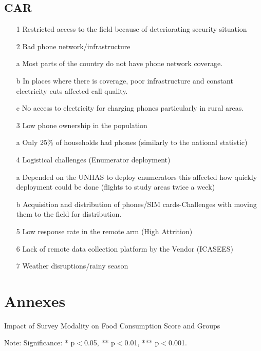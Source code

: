 \documentclass[11pt,harvard]{article}
\begin{document}
\subsection{CAR}

\begin{itemize}[label=--, left=1.5em]
	\item[1] Restricted access to the field because of deteriorating security situation
	\item[2] Bad phone network/infrastructure 
		\item[a]	Most parts of the country do not have phone network coverage.
		\item[b]	In places where there is coverage, poor infrastructure and constant electricity cuts affected call quality.
		\item[c]	No access to electricity for charging phones particularly in rural areas.
	\item[3] Low phone ownership in the population
		\item[a] Only 25\% of households had phones (similarly to the national statistic)
	\item[4] Logistical challenges (Enumerator deployment)
		\item[a]	Depended on the UNHAS to deploy enumerators this affected how quickly deployment could be done (flights to study areas twice a week)
		\item[b]	Acquisition and distribution of phones/SIM cards-Challenges with moving them to the field for distribution.
	\item[5] Low response rate in the remote arm (High Attrition)
	\item[6] Lack of remote data collection platform by the Vendor (ICASEES) 
	\item[7] Weather disruptions/rainy season
\end{itemize}


\pagebreak


\section{Annexes}

	\begin{table}[htbp]
	\centering
	\begin{adjustbox}{max width=\textwidth}
		\begin{threeparttable}
			\caption{Impact of Survey Modality on Food Consumption Score and Groups}
			\scriptsize
			 
			\label{tab:FCS_Modality_All_Country_Short}
			\begin{tablenotes}
				\item Note: Significance: * p$<$0.05, ** p$<$0.01, *** p$<$0.001. 
			\end{tablenotes}
		\end{threeparttable}
	\end{adjustbox}
\end{table}
\end{document}
